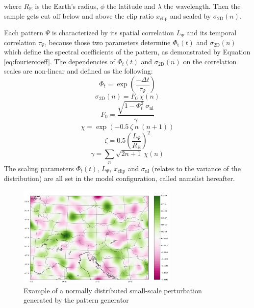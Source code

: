 where $R_{\mathrm{E}}$ is the Earth's radius, $\phi$ the latitude and $\lambda$ the wavelength. Then the sample gets cut off below and above the clip ratio  $x_{\mathrm{clip}}$  and scaled by $\sigma_{\mathrm{2D}}(n)$.



Each  pattern $\Psi$ is characterized by its spatial correlation $ L_{\Psi}$ and its temporal correlation $ \tau_{\Psi}$, because those two parameters determine $\Phi_{\mathrm{t}} (t)$ and $\sigma_{\mathrm{2D}}(n)$ which define the spectral coefficients of the pattern, as demonstrated by Equation \eqref{eq:fouriercoeff}. The dependencies of  $\Phi_{t} (t)$ and $\sigma_{\mathrm{2D}}(n)$ on the correlation scales are non-linear and defined as the following:\\
\begin{equation}
    \Phi_{t} = \exp \left( \frac{ - \Delta t}{\tau_{ \Psi}} \right)
\end{equation}
\begin{equation}
    \sigma_{\mathrm{2D}}(n) = F_{0} \ \chi(n)
    \label{eq:std}
\end{equation}
\begin{equation}
    F_{0}=\frac{\sqrt{1 - \Phi_{t}^2} \ \sigma_{\mathrm{nl}}}{ \gamma}  
\end{equation}
\begin{equation}
    \chi =  \exp (-0.5 \  \zeta \  n \ (n+1))
\end{equation}
\begin{equation}
\zeta = 0.5 \left( \frac{L_{\Psi}}{R_{\mathrm{E}}} \right)^{2}
\end{equation}
\begin{equation}
    \gamma = \sum_{n} \sqrt{2n +1} \ \chi (n)
\end{equation}
The scaling parameters $\Phi_{t} (t)$, $ L_{\Psi}$, $x_{\mathrm{clip}}$ and $\sigma_{\mathrm{nl}}$ (relates to the variance of the distribution) are all set in the model configuration, called namelist hereafter.
\begin{figure}[h]
\captionsetup{width=.7\linewidth}
    \centering
    \includegraphics[width=0.7\textwidth]{graphics/mesoscale-pert.png}
    \caption[Example of a Small-Scale Perturbation]{Example of a normally distributed small-scale perturbation generated by the pattern generator}
    \label{fig:example-pert}
\end{figure}
